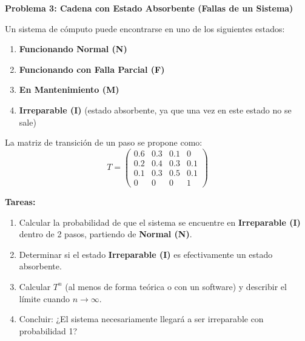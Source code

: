 \documentclass{article}
\begin{document}
\begin{problem}
\textbf{Problema 3: Cadena con Estado Absorbente (Fallas de un Sistema)}

Un sistema de cómputo puede encontrarse en uno de los siguientes estados:
\begin{enumerate}
    \item \textbf{Funcionando Normal (N)}
    \item \textbf{Funcionando con Falla Parcial (F)}
    \item \textbf{En Mantenimiento (M)}
    \item \textbf{Irreparable (I)} (estado absorbente, ya que una vez en este estado no se sale)
\end{enumerate}

La matriz de transición de un paso se propone como:
\[
T = \begin{pmatrix}
0.6 & 0.3 & 0.1 & 0 \\
0.2 & 0.4 & 0.3 & 0.1 \\
0.1 & 0.3 & 0.5 & 0.1 \\
0   & 0   & 0   & 1
\end{pmatrix}
\]

\textbf{Tareas:}
\begin{enumerate}
    \item Calcular la probabilidad de que el sistema se encuentre en \textbf{Irreparable (I)} dentro de 2 pasos, partiendo de \textbf{Normal (N)}.
    \item Determinar si el estado \textbf{Irreparable (I)} es efectivamente un estado absorbente.
    \item Calcular \(T^n\) (al menos de forma teórica o con un software) y describir el límite cuando \( n \to \infty \).
    \item Concluir: ¿El sistema necesariamente llegará a ser irreparable con probabilidad 1?
\end{enumerate}
\end{problem}


\end{document}

